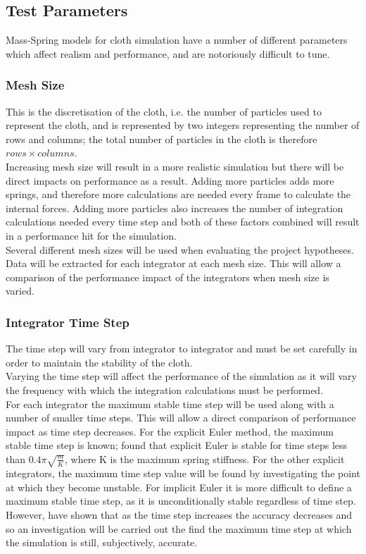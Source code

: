 \subsection{Test Parameters}
Mass-Spring models for cloth simulation have a number of different parameters which affect realism and performance, and are notoriously difficult to tune.

\subsubsection{Mesh Size}
This is the discretisation of the cloth, i.e. the number of particles used to represent the cloth, and is represented by two integers representing the number of rows and columns; the total number of particles in the cloth is therefore $rows \times columns$.
\\Increasing mesh size will result in a more realistic simulation but there will be direct impacts on performance as a result. Adding more particles adds more springs, and therefore more calculations are needed every frame to calculate the internal forces. Adding more particles also increases the number of integration calculations needed every time step and both of these factors combined will result in a performance hit for the simulation.
\\Several different mesh sizes will be used when evaluating the project hypotheses. Data will be extracted for each integrator at each mesh size. This will allow a comparison of the performance impact of the integrators when mesh size is varied.

\subsubsection{Integrator Time Step}
The time step will vary from integrator to integrator and must be set carefully in order to maintain the stability of the cloth.
\\Varying the time step will affect the performance of the simulation as it will vary the frequency with which the integration calculations must be performed.
\\For each integrator the maximum stable time step will be used along with a number of smaller time steps. This will allow a direct comparison of performance impact as time step decreases. For the explicit Euler method, the maximum stable time step is known; \textcite[2]{Vassilev2001} found that explicit Euler is stable for time steps less than $0.4\pi\sqrt{\frac{m}{K}}$, where K is the maximum spring stiffness. For the other explicit integrators, the maximum time step value will be found by investigating the point at which they become unstable. For implicit Euler it is more difficult to define a maximum stable time step, as it is unconditionally stable regardless of time step. However, \textcite{Volino2001} have shown that as the time step increases the accuracy decreases and so an investigation will be carried out the find the maximum time step at which the simulation is still, subjectively, accurate.

